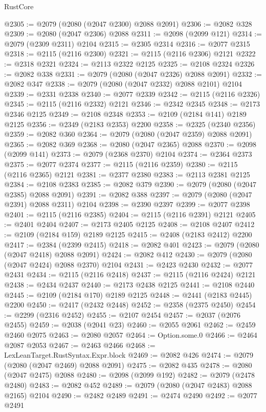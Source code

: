 \begin{lexlean}{RustCore}
\begin{coremodule}
@2305 := @2079 (@2080 (@2047 @2300) @2088 @2091)
@2306 := @2082 @328
@2309 := @2080 (@2047 @2306) @2088
@2311 := @2098 (@2099 @121)
@2314 := @2079 (@2309 @2311) @2104
@2315 := @2305 @2314
@2316 := @2077 @2315
@2318 := @2115 (@2116 @2300)
@2321 := @2115 (@2116 @2306) @2121
@2322 := @2318 @2321
@2324 := @2113 @2322 @2125
@2325 := @2108 @2324
@2326 := @2082 @338
@2331 := @2079 (@2080 (@2047 @2326) @2088 @2091)
@2332 := @2082 @347
@2338 := @2079 (@2080 (@2047 @2332) @2088 @2101) @2104
@2339 := @2331 @2338
@2340 := @2077 @2339
@2342 := @2115 (@2116 @2326)
@2345 := @2115 (@2116 @2332) @2121
@2346 := @2342 @2345
@2348 := @2173 @2346 @2125
@2349 := @2108 @2348
@2353 := @2109 (@2184 @141) @2189 @2125
@2356 := @2349 (@2183 @2353) @2200
@2358 := @2325 (@2340 @2356)
@2359 := @2082 @360
@2364 := @2079 (@2080 (@2047 @2359) @2088 @2091)
@2365 := @2082 @369
@2368 := @2080 (@2047 @2365) @2088
@2370 := @2098 (@2099 @141)
@2373 := @2079 (@2368 @2370) @2104
@2374 := @2364 @2373
@2375 := @2077 @2374
@2377 := @2115 (@2116 @2359)
@2380 := @2115 (@2116 @2365) @2121
@2381 := @2377 @2380
@2383 := @2113 @2381 @2125
@2384 := @2108 @2383
@2385 := @2082 @379
@2390 := @2079 (@2080 (@2047 @2385) @2088 @2091)
@2391 := @2082 @388
@2397 := @2079 (@2080 (@2047 @2391) @2088 @2311) @2104
@2398 := @2390 @2397
@2399 := @2077 @2398
@2401 := @2115 (@2116 @2385)
@2404 := @2115 (@2116 @2391) @2121
@2405 := @2401 @2404
@2407 := @2173 @2405 @2125
@2408 := @2108 @2407
@2412 := @2109 (@2184 @159) @2189 @2125
@2415 := @2408 (@2183 @2412) @2200
@2417 := @2384 (@2399 @2415)
@2418 := @2082 @401
@2423 := @2079 (@2080 (@2047 @2418) @2088 @2091)
@2424 := @2082 @412
@2430 := @2079 (@2080 (@2047 @2424) @2088 @2370) @2104
@2431 := @2423 @2430
@2432 := @2077 @2431
@2434 := @2115 (@2116 @2418)
@2437 := @2115 (@2116 @2424) @2121
@2438 := @2434 @2437
@2440 := @2173 @2438 @2125
@2441 := @2108 @2440
@2445 := @2109 (@2184 @170) @2189 @2125
@2448 := @2441 (@2183 @2445) @2200
@2450 := @2417 (@2432 @2448)
@2452 := @2358 (@2375 @2450)
@2454 := @2299 (@2316 @2452)
@2455 := @2107 @2454
@2457 := @2037 (@2076 @2455)
@2459 := @2038 (@2041 @23)
@2460 := @2055 @2061
@2462 := @2459 @2460 @2075
@2463 := @2080 @2057
@2464 := Option.some.{0}
@2466 := @2464 @2087 @2053
@2467 := @2463 @2466
@2468 := LexLeanTarget.RustSyntax.Expr.block
@2469 := @2082 @426
@2474 := @2079 (@2080 (@2047 @2469) @2088 @2091)
@2475 := @2082 @435
@2478 := @2080 (@2047 @2475) @2088
@2480 := @2098 (@2099 @192)
@2482 := @2079 (@2478 @2480)
@2483 := @2082 @452
@2489 := @2079 (@2080 (@2047 @2483) @2088 @2165) @2104
@2490 := @2482 @2489
@2491 := @2474 @2490
@2492 := @2077 @2491

\end{coremodule}
\end{lexlean}
